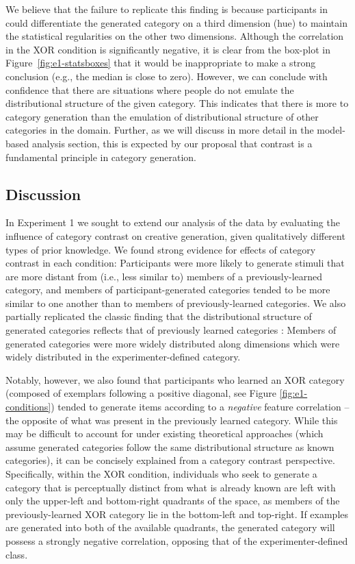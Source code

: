 \documentclass[12pt]{article}
\begin{document}
\begin{flushleft}
We believe that the failure to replicate this finding is because participants in \cite{jern2013probabilistic} could differentiate the generated category on a third dimension (hue) to maintain the statistical regularities on the other two dimensions. Although the correlation in the XOR condition is significantly negative, it is clear from the box-plot in Figure~\ref{fig:e1-statsboxes} that it would be inappropriate to make a strong conclusion (e.g., the median is close to zero). However, we can conclude with confidence that there are situations where people do not emulate the distributional structure of the given category. This indicates that there is more to category generation than the emulation of distributional structure of other categories in the domain. Further, as we will discuss in more detail in the model-based analysis section, this is expected by our proposal that contrast is a fundamental principle in category generation.


\subsection{Discussion}


In Experiment 1 we sought to extend our analysis of the \cite{jern2013probabilistic} data by evaluating the influence of category contrast on creative generation, given qualitatively different types of prior knowledge. We found strong evidence for effects of category contrast in each condition: Participants were more likely to generate stimuli that are more distant from (i.e., less similar to) members of a previously-learned category, and members of participant-generated categories tended to be more similar to one another than to members of previously-learned categories. We also partially replicated the classic finding that the distributional structure of generated categories reflects that of previously learned categories \citep{jern2013probabilistic,ward1994structured}: Members of generated categories were more widely distributed along dimensions which were widely distributed in the experimenter-defined category. 

Notably, however, we also found that participants who learned an XOR category (composed of exemplars following a positive diagonal, see Figure \ref{fig:e1-conditions}) tended to generate items according to a {\em negative} feature correlation -- the opposite of what was present in the previously learned category. While this may be difficult to account for under existing theoretical approaches (which assume generated categories follow the same distributional structure as known categories), it can be concisely explained from a category contrast perspective. Specifically, within the XOR condition, individuals who seek to generate a category that is perceptually distinct from what is already known are left with only the upper-left and bottom-right quadrants of the space, as members of the previously-learned XOR category lie in the bottom-left and top-right. If examples are generated into both of the available quadrants, the generated category will possess a strongly negative correlation, opposing that of the experimenter-defined class.


\end{flushleft}
\end{document}
